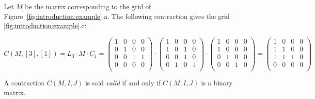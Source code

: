 \begin{example}
	Let $M$ be the matrix corresponding to the grid of Figure~\ref{fig:introduction:example}.a. The following contraction gives the grid \ref{fig:introduction:example}.c:
	
	$$
	C(M,[3],[1]) = L_3 \cdot M \cdot C_1 = \begin{pmatrix}
	1 & 0 & 0 & 0 \\
	0 & 1 & 0 & 0 \\
	0 & 0 & 1 & 1 \\
	0 & 0 & 0 & 0 \\
	\end{pmatrix} \cdot \begin{pmatrix}
	1 & 0 & 0 & 0 \\
	1 & 0 & 1 & 0 \\
	0 & 0 & 1 & 0 \\
	0 & 1 & 0 & 1\\
	\end{pmatrix} \cdot \begin{pmatrix}
	1 & 0 & 0 & 0 \\
	1 & 0 & 0 & 0 \\
	0 & 1 & 0 & 0 \\
	0 & 0 & 1 & 0 \\
	\end{pmatrix} = \begin{pmatrix}
	1 & 0 & 0 & 0 \\
	1 & 1 & 0 & 0 \\
	1 & 1 & 1 & 0 \\
	0 & 0 & 0 & 0 \\
	\end{pmatrix}
	$$
\end{example}

\begin{definition}
	A contraction $C(M,I,J)$ is said \emph{valid} if and only if $C(M,I,J)$ is a binary matrix.
\end{definition}

